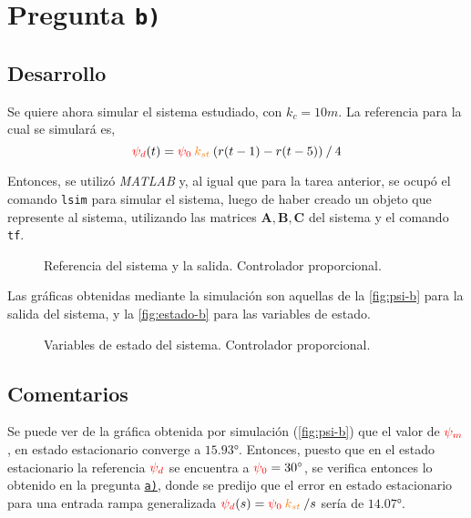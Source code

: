 \section{Pregunta \texttt{b)}}\label{pregunta-b}

\subsection{Desarrollo}

Se quiere ahora simular el sistema estudiado, con $k_{c} = 10\unit{m}$.
La referencia para la cual se simulará es,
\begin{equation}
  \rojo{\psi_{d}}(t) = \rojo{\psi_{0}}\nara{k_{st}}\left(r(t-1) - r(t-5)\right) \mathbin{/} 4
  \label{eq:referencia}
\end{equation}

Entonces, se utilizó \textit{MATLAB} y, al igual que para la tarea anterior,
se ocupó el comando \verb|lsim| para simular el sistema, luego de haber
creado un objeto que represente al sistema, utilizando las matrices
$\mathbf{A}, \mathbf{B}, \mathbf{C}$ del sistema y el comando \verb|tf|.

\begin{figure}[ht]
  \centering
  
  \caption{Referencia del sistema y la salida. Controlador proporcional.}
  \label{fig:psi-b}
\end{figure}

Las gráficas obtenidas mediante la simulación son aquellas de la \autoref{fig:psi-b} para
la salida del sistema, y la \autoref{fig:estado-b} para las variables de estado.

\begin{figure}[ht]
  \centering
  
  \caption{Variables de estado del sistema. Controlador proporcional.}
  \label{fig:estado-b}
\end{figure}

\subsection{Comentarios}

Se puede ver de la gráfica obtenida por simulación (\autoref{fig:psi-b}) que el
valor de $\mathbin{\color{red}\psi_{m}}$, en estado estacionario converge a $\ang{15.93}$.
Entonces, puesto que en el estado estacionario la referencia $\mathbin{\color{red}\psi_{d}}$
se encuentra a $\mathbin{\color{red}\psi_{0}} = \ang{30}$, se verifica entonces lo obtenido en
la pregunta \hyperref[pregunta-a]{\texttt{a)}}, donde se predijo que el error en
estado estacionario para una entrada rampa generalizada
$\rojo{\psi_{d}}(s) = \rojo{\psi_{0}}\nara{k_{st}}\mathbin{/}s$ sería de $\ang{14.07}$.

